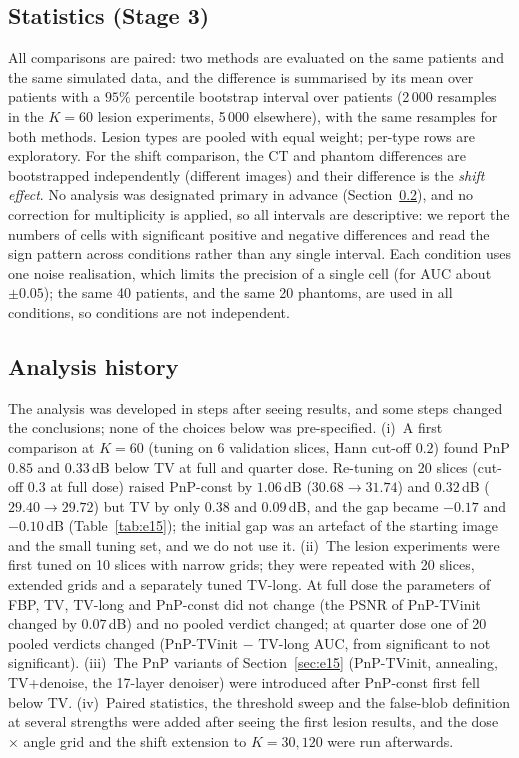 \subsection{Statistics (Stage 3)}\label{sec:stats3}
All comparisons are paired: two methods are evaluated on the same patients and the same simulated data, and the difference is summarised by its mean over patients with a $95\%$ percentile bootstrap interval over patients (2\,000 resamples in the $K=60$ lesion experiments, 5\,000 elsewhere), with the same resamples for both methods.
Lesion types are pooled with equal weight; per-type rows are exploratory. For the shift comparison, the CT and phantom differences are bootstrapped independently (different images) and their difference is the \emph{shift effect}.
No analysis was designated primary in advance (Section~\ref{sec:history3}), and no correction for multiplicity is applied, so all intervals are descriptive: we report the numbers of cells with significant positive and negative differences
and read the sign pattern across conditions rather than any single interval. Each condition uses one noise realisation, which limits the precision of a single cell (for AUC about $\pm0.05$); the same 40 patients, and the same 20 phantoms, are used in all conditions, so conditions are not independent.

\subsection{Analysis history}\label{sec:history3}
The analysis was developed in steps after seeing results, and some steps changed the conclusions; none of the choices below was pre-specified.
(i)~A first comparison at $K=60$ (tuning on 6 validation slices, Hann cut-off $0.2$) found PnP $0.85$ and $0.33$\,dB below TV at full and quarter dose.
Re-tuning on 20 slices (cut-off $0.3$ at full dose) raised PnP-const by $1.06$\,dB ($30.68\to31.74$) and $0.32$\,dB ($29.40\to29.72$) but TV by only $0.38$ and $0.09$\,dB, and the gap became $-0.17$ and $-0.10$\,dB (Table~\ref{tab:e15}); the initial gap was an artefact of the starting image and the small tuning set, and we do not use it.
(ii)~The lesion experiments were first tuned on 10 slices with narrow grids; they were repeated with 20 slices, extended grids and a separately tuned TV-long. At full dose the parameters of FBP, TV, TV-long and PnP-const did not change (the PSNR of PnP-TVinit changed by $0.07$\,dB) and no pooled verdict changed; at quarter dose one of 20 pooled verdicts changed (PnP-TVinit $-$ TV-long AUC, from significant to not significant).
(iii)~The PnP variants of Section~\ref{sec:e15} (PnP-TVinit, annealing, TV+denoise, the 17-layer denoiser) were introduced after PnP-const first fell below TV.
(iv)~Paired statistics, the threshold sweep and the false-blob definition at several strengths were added after seeing the first lesion results, and the dose $\times$ angle grid and the shift extension to $K=30,120$ were run afterwards.